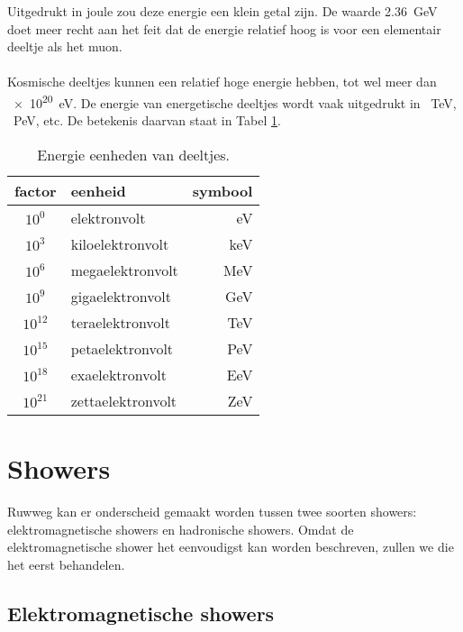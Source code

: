 Uitgedrukt in joule zou deze energie een klein getal zijn. De waarde
\SI{2,36}{\giga\electronvolt} doet meer recht aan het feit dat de
energie relatief hoog is voor een elementair deeltje als het muon. 
\\ \\

Kosmische deeltjes kunnen een relatief hoge energie hebben, tot wel meer
dan \SI{e20}{\electronvolt}. De energie van energetische deeltjes wordt
vaak uitgedrukt in \SI{}{\tera\electronvolt}, \SI{}{\peta\electronvolt},
etc. De betekenis daarvan staat in Tabel \ref{eenheden}.

\begin{table}[h]
    \centering
    \begin{tabular}{|c|l|r|} \hline
        factor & eenheid & symbool \\ \hline
        $10^0$ & elektronvolt & eV \\
        $10^3$ & kiloelektronvolt & keV \\
        $10^6$ & megaelektronvolt & MeV \\
        $10^9$ & gigaelektronvolt & GeV \\
        $10^{12}$ & teraelektronvolt & TeV \\
        $10^{15}$ & petaelektronvolt & PeV \\
        $10^{18}$ & exaelektronvolt & EeV \\
        $10^{21}$ & zettaelektronvolt & ZeV \\ \hline
    \end{tabular}
    \caption{Energie eenheden van deeltjes.}
    \label{eenheden}
\end{table}


\section{Showers}

Ruwweg kan er onderscheid gemaakt worden tussen twee soorten showers:
elektromagnetische showers en hadronische showers. Omdat de
elektromagnetische shower het eenvoudigst kan worden beschreven, zullen
we die het eerst behandelen. 


\subsection{Elektromagnetische showers}

